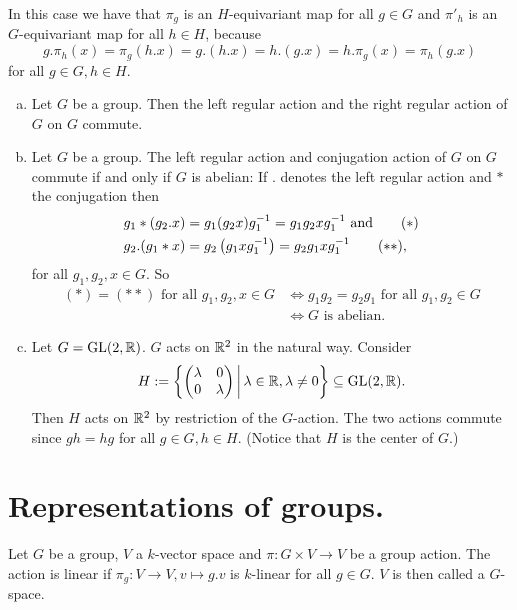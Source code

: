\begin{rem}
 In this case we have that $\pi_g$ is an $H$-equivariant map for all $g \in G$ and $\pi'_h$ is an $G$-equivariant map for all $h \in H$, because
 \[
  g.\pi_h(x) = \pi_g(h.x) = g.(h.x) = h.(g.x) = h.\pi_g(x) = \pi_h(g.x)
 \]
 for all $g \in G, h \in H$.
\end{rem}


\begin{expls}
 \begin{enumerate}[a)]
  \item
   Let $G$ be a group. Then the left regular action and the right regular action of $G$ on $G$ commute.
  \item
   Let $G$ be a group. The left regular action and conjugation action of $G$ on $G$ commute if and only if $G$ is abelian: If $.$ denotes the left regular action and $*$ the conjugation then
   \begin{align*}
    g_1*(g_2.x) &= g_1 (g_2 x) g_1^{-1} = g_1 g_2 x g_1^{-1} \text{ and} \tag{\ensuremath{\ast}}\\
    g_2.(g_1*x) &= g_2 \left(g_1 x g_1^{-1}\right) = g_2 g_1 x g_1^{-1} \tag{\ensuremath{\ast\ast}},
   \end{align*}
   for all $g_1, g_2, x \in G$. So
   \begin{align*}
    (\ast) = (\ast\ast) \text{ for all } g_1, g_2, x \in G
    &\Leftrightarrow g_1 g_2 = g_2 g_1 \text{ for all } g_1, g_2 \in G \\
    &\Leftrightarrow \text{$G$ is abelian}.
   \end{align*}
  \item
   Let $G = \operatorname{GL}(2,\mathbb{R})$. $G$ acts on $\mathbb{R}^2$ in the natural way. Consider
   \[
    H := \left\{ \begin{pmatrix}\lambda&0\\0&\lambda\end{pmatrix} \,\middle|\, \lambda \in \mathbb{R}, \lambda \neq 0 \right\} \subseteq \operatorname{GL}(2,\mathbb{R}).
   \]
   Then $H$ acts on $\mathbb{R}^2$ by restriction of the $G$-action. The two actions commute since $gh = hg$ for all $g \in G, h \in H$. (Notice that $H$ is the center of $G$.)
 \end{enumerate}
\end{expls}


\section{Representations of groups.}


\begin{defi}
 Let $G$ be a group, $V$ a $k$-vector space and $\pi : G \times V \to V$ be a group action. The action is linear if $\pi_g : V \to V, v \mapsto g.v$ is $k$-linear for all $g \in G$. $V$ is then called a $G$-space.
\end{defi}


